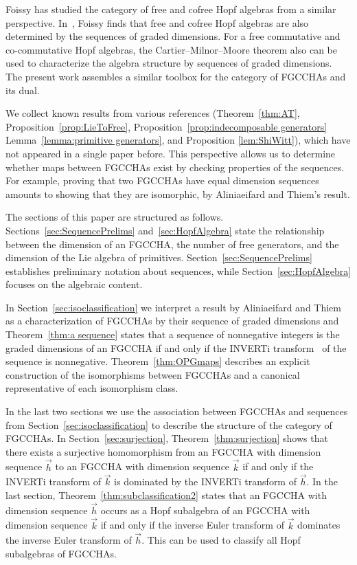 \documentclass[11pt]{amsart}
\theoremstyle{definition}
\numberwithin{equation}{section}
\newcommand{\FGCCHA}{\textsf{FGCCHA}\xspace}
\newcommand{\FGCCHAs}{\textsf{FGCCHA}s\xspace}
\begin{document}
Foissy \cite{F12} has studied the category of free and cofree Hopf algebras from a similar perspective. 
In~\cite[Proposition 23]{F12}, Foissy finds that free and cofree Hopf algebras are also determined by the sequences of
graded dimensions.
For a free commutative and co-commutative Hopf algebras, the Cartier--Milnor--Moore theorem
also can be used to characterize the algebra structure by sequences of graded dimensions.
The present work assembles a similar toolbox for the category of \FGCCHAs and its dual.

We collect known results from various references (Theorem~\ref{thm:AT}, Proposition~\ref{prop:LieToFree}, Proposition~\ref{prop:indecomposable generators} Lemma~\ref{lemma:primitive generators}, and Proposition \ref{lem:ShiWitt}), which have not appeared in a single paper before.  This perspective allows us to determine whether maps between \FGCCHAs exist by checking properties of the sequences.  
For example, proving that two \FGCCHAs have equal dimension sequences amounts to showing that they are isomorphic, by Aliniaeifard and Thiem's result.

The sections of this paper are structured as follows.
Sections~\ref{sec:SequencePrelims} and~\ref{sec:HopfAlgebra} state the
relationship between the dimension of an \FGCCHA, the number of free generators,
and the dimension of the Lie algebra of primitives. Section~\ref{sec:SequencePrelims}
establishes preliminary notation about sequences, while Section~\ref{sec:HopfAlgebra}
focuses on the algebraic content.

In Section~\ref{sec:isoclassification} we interpret a result by
Aliniaeifard and Thiem as a characterization of \FGCCHAs by their
sequence of graded dimensions and Theorem~\ref{thm:a sequence}
states that a sequence of nonnegative integers is the graded
dimensions of an \FGCCHA if and only if the INVERTi transform~\cite{OEIS}
of the sequence is nonnegative.
Theorem~\ref{thm:OPGmaps} describes an explicit construction of the
isomorphisms between \FGCCHAs and a canonical representative of each isomorphism class.

In the last two sections we use the association between \FGCCHAs
and sequences from Section~\ref{sec:isoclassification}
to describe the structure of the category of \FGCCHAs.
In Section~\ref{sec:surjection}, Theorem~\ref{thm:surjection} 
shows that there exists a surjective homomorphism from an \FGCCHA with
dimension sequence $\vec{h}$ to an \FGCCHA with dimension sequence 
$\vec{k}$ if and only if the INVERTi transform of $\vec{k}$ is dominated by 
the INVERTi transform of $\vec{h}$.
In the last section, Theorem~\ref{thm:subclassification2} states
that an \FGCCHA  with dimension sequence $\vec{h}$ occurs as a Hopf 
subalgebra of an \FGCCHA with dimension sequence $\vec{k}$ if and only if 
the inverse Euler transform of $\vec{k}$ dominates the inverse Euler transform of $\vec{h}$.  
This can be used to classify all Hopf subalgebras of \FGCCHAs.
\end{document}

